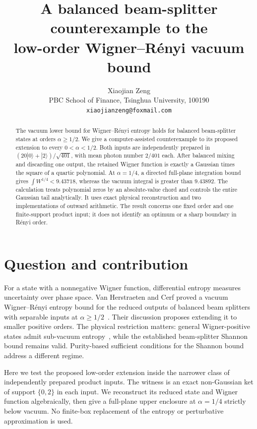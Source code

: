 \documentclass[11pt]{article}
\title{A balanced beam-splitter counterexample to the\\ low-order Wigner--R\'enyi vacuum bound}
\author{Xiaojian Zeng\\
\small PBC School of Finance, Tsinghua University, 100190\\
\small \texttt{xiaojianzeng@foxmail.com}}
\date{}
\newcommand{\ket}[1]{|#1\rangle}
\begin{document}
\maketitle
\begin{abstract}
The vacuum lower bound for Wigner--R\'enyi entropy holds for balanced
beam-splitter states at orders $\alpha\geq 1/2$. We give a computer-assisted
counterexample to its proposed extension to every $0<\alpha<1/2$.
Both inputs are independently prepared in
$(20\ket{0}+\ket{2})/\sqrt{401}$, with mean photon number $2/401$ each.
After balanced mixing and discarding one output, the retained Wigner function
is exactly a Gaussian times the square of a quartic polynomial.
At $\alpha=1/4$, a directed full-plane integration bound gives
$\int W^{1/4}<9.43718$, whereas the vacuum integral is greater than $9.43892$.
The calculation treats polynomial zeros by an absolute-value chord and controls
the entire Gaussian tail analytically. It uses exact physical reconstruction
and two implementations of outward arithmetic. The result concerns one fixed
order and one finite-support product input; it does not identify an optimum
or a sharp boundary in R\'enyi order.
\end{abstract}

\section{Question and contribution}
For a state with a nonnegative Wigner function, differential entropy measures
uncertainty over phase space. Van Herstraeten and Cerf proved a vacuum
Wigner--R\'enyi entropy bound for the reduced outputs of balanced beam splitters
with separable inputs at $\alpha\geq 1/2$~\cite{interference}.
Their discussion proposes extending it to smaller positive orders.
The physical restriction matters: general Wigner-positive states admit
sub-vacuum entropy~\cite{general,he}, while the established beam-splitter
Shannon bound remains valid. Purity-based sufficient conditions for the
Shannon bound~\cite{purity} address a different regime.

Here we test the proposed low-order extension inside the narrower class of
independently prepared product inputs. The witness is an exact non-Gaussian
ket of support $\{0,2\}$ in each input. We reconstruct its reduced state
and Wigner function algebraically, then give a full-plane upper enclosure
at $\alpha=1/4$ strictly below vacuum. No finite-box replacement of the entropy
or perturbative approximation is used.
\end{document}
